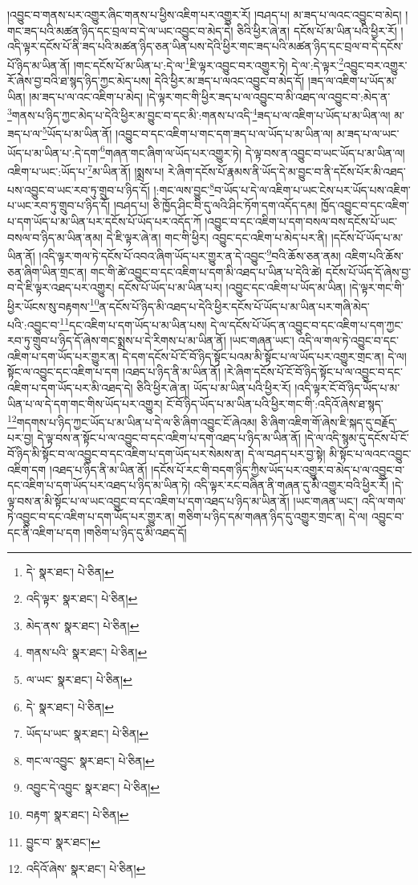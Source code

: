 །འབྱུང་བ་གནས་པར་འགྱུར་ཞིང་གནས་པ་ཕྱིས་འཇིག་པར་འགྱུར་རོ། །བཤད་པ། མ་ཟད་པ་ལའང་འབྱུང་བ་མེད། །གང་ཟད་པའི་མཚན་ཉིད་དང་བྲལ་བ་དེ་ལ་ཡང་འབྱུང་བ་མེད་དེ། ཅིའི་ཕྱིར་ཞེ་ན། དངོས་པོ་མ་ཡིན་པའི་ཕྱིར་རོ། །འདི་ལྟར་དངོས་པོ་ནི་ཟད་པའི་མཚན་ཉིད་ཅན་ཡིན་པས་དེའི་ཕྱིར་གང་ཟད་པའི་མཚན་ཉིད་དང་བྲལ་བ་དེ་དངོས་པོ་ཉིད་མ་ཡིན་ནོ། །གང་དངོས་པོ་མ་ཡིན་པ་:དེ་ལ་\footnote{དེ་  སྣར་ཐང་།  པེ་ཅིན། }ཇི་ལྟར་འབྱུང་བར་འགྱུར་ཏེ། དེ་ལ་:དེ་ལྟར་\footnote{འདི་ལྟར་  སྣར་ཐང་།  པེ་ཅིན། }འབྱུང་བར་འགྱུར་རོ་ཞེས་བྱ་བའི་ཐ་སྙད་ཉིད་ཀྱང་མེད་པས། དེའི་ཕྱིར་མ་ཟད་པ་ལའང་འབྱུང་བ་མེད་དོ། །ཟད་ལ་འཇིག་པ་ཡོད་མ་ཡིན། །མ་ཟད་པ་ལ་འང་འཇིག་པ་མེད། །དེ་ལྟར་གང་གི་ཕྱིར་ཟད་པ་ལ་འབྱུང་བ་མི་འཐད་ལ་འབྱུང་བ་:མེད་ན་\footnote{མེད་ནས་  སྣར་ཐང་།  པེ་ཅིན། }གནས་པ་ཉིད་ཀྱང་མེད་པ་དེའི་ཕྱིར་མ་བྱུང་བ་དང་མི་:གནས་པ་འདི་\footnote{གནས་པའི་  སྣར་ཐང་།  པེ་ཅིན། }ཟད་པ་ལ་འཇིག་པ་ཡོད་པ་མ་ཡིན་ལ། མ་ཟད་པ་ལ་\footnote{ལ་ཡང་  སྣར་ཐང་།  པེ་ཅིན། }ཡོད་པ་མ་ཡིན་ནོ། །འབྱུང་བ་དང་འཇིག་པ་གང་དག་ཟད་པ་ལ་ཡོད་པ་མ་ཡིན་ལ། མ་ཟད་པ་ལ་ཡང་ཡོད་པ་མ་ཡིན་པ་:དེ་དག་\footnote{དེ་  སྣར་ཐང་།  པེ་ཅིན། }གཞན་གང་ཞིག་ལ་ཡོད་པར་འགྱུར་ཏེ། དེ་ལྟ་བས་ན་འབྱུང་བ་ཡང་ཡོད་པ་མ་ཡིན་ལ། འཇིག་པ་ཡང་:ཡོད་པ་\footnote{ཡོད་པ་ཡང་  སྣར་ཐང་།  པེ་ཅིན། }མ་ཡིན་ནོ། །སྨྲས་པ། རེ་ཞིག་དངོས་པོ་རྣམས་ནི་ཡོད་དེ་མ་བྱུང་བ་ནི་དངོས་པོར་མི་འཐད་པས་འབྱུང་བ་ཡང་རབ་ཏུ་གྲུབ་པ་ཉིད་དོ། །:གང་ལས་བྱུང་\footnote{གང་ལ་འབྱུང་  སྣར་ཐང་།  པེ་ཅིན། }བ་ཡོད་པ་དེ་ལ་འཇིག་པ་ཡང་ངེས་པར་ཡོད་པས་འཇིག་པ་ཡང་རབ་ཏུ་གྲུབ་པ་ཉིད་དོ། །བཤད་པ། ཅི་ཁྱོད་ཤིང་བི་དུ་ལའི་ཤིང་ཏོག་དག་འདོད་དམ། ཁྱོད་འབྱུང་བ་དང་འཇིག་པ་དག་ཡོད་པ་མ་ཡིན་པར་དངོས་པོ་ཡོད་པར་འདོད་ཀོ །འབྱུང་བ་དང་འཇིག་པ་དག་བསལ་བས་དངོས་པོ་ཡང་བསལ་བ་ཉིད་མ་ཡིན་ནམ། དེ་ཇི་ལྟར་ཞེ་ན། གང་གི་ཕྱིར། འབྱུང་དང་འཇིག་པ་མེད་པར་ནི། །དངོས་པོ་ཡོད་པ་མ་ཡིན་ནོ། །འདི་ལྟར་གལ་ཏེ་དངོས་པོ་འབའ་ཞིག་ཡོད་པར་གྱུར་ན་དེ་འབྱུང་\footnote{འབྱུང་དེ་འབྱུང་  སྣར་ཐང་།  པེ་ཅིན། }བའི་ཆོས་ཅན་ནམ། འཇིག་པའི་ཆོས་ཅན་ཞིག་ཡིན་གྲང་ན། གང་གི་ཚེ་འབྱུང་བ་དང་འཇིག་པ་དག་མི་འཐད་པ་ཡིན་པ་དེའི་ཚེ། དངོས་པོ་ཡོད་དོ་ཞེས་བྱ་བ་དེ་ཇི་ལྟར་འཐད་པར་འགྱུར། དངོས་པོ་ཡོད་པ་མ་ཡིན་པར། །འབྱུང་དང་འཇིག་པ་ཡོད་མ་ཡིན། །དེ་ལྟར་གང་གི་ཕྱིར་ཡོངས་སུ་བརྟགས་\footnote{བརྟག་  སྣར་ཐང་།  པེ་ཅིན། }ན་དངོས་པོ་ཉིད་མི་འཐད་པ་དེའི་ཕྱིར་དངོས་པོ་ཡོད་པ་མ་ཡིན་པར་གཞི་མེད་པའི་:འབྱུང་བ་\footnote{བྱུང་བ་  སྣར་ཐང་། }དང་འཇིག་པ་དག་ཡོད་པ་མ་ཡིན་པས། དེ་ལ་དངོས་པོ་ཡོད་ན་འབྱུང་བ་དང་འཇིག་པ་དག་ཀྱང་རབ་ཏུ་གྲུབ་པ་ཉིད་དོ་ཞེས་གང་སྨྲས་པ་དེ་རིགས་པ་མ་ཡིན་ནོ། །ཡང་གཞན་ཡང་། འདི་ལ་གལ་ཏེ་འབྱུང་བ་དང་འཇིག་པ་དག་ཡོད་པར་གྱུར་ན། དེ་དག་དངོས་པོ་ངོ་བོ་ཉིད་སྟོང་པའམ་མི་སྟོང་པ་ལ་ཡོད་པར་འགྱུར་གྲང་ན། དེ་ལ། སྟོང་ལ་འབྱུང་དང་འཇིག་པ་དག །འཐད་པ་ཉིད་ནི་མ་ཡིན་ནོ། །རེ་ཞིག་དངོས་པོ་ངོ་བོ་ཉིད་སྟོང་པ་ལ་འབྱུང་བ་དང་འཇིག་པ་དག་ཡོད་པར་མི་འཐད་དེ། ཅིའི་ཕྱིར་ཞེ་ན། ཡོད་པ་མ་ཡིན་པའི་ཕྱིར་རོ། །འདི་ལྟར་ངོ་བོ་ཉིད་ཡོད་པ་མ་ཡིན་པ་ལ་དེ་དག་གང་གིས་ཡོད་པར་འགྱུར། ངོ་བོ་ཉིད་ཡོད་པ་མ་ཡིན་པའི་ཕྱིར་གང་གི་:འདིའོ་ཞེས་ཐ་སྙད་\footnote{འདིའོ་ཞེས་  སྣར་ཐང་།  པེ་ཅིན། }གདགས་པ་ཉིད་ཀྱང་ཡོད་པ་མ་ཡིན་པ་དེ་ལ་ཅི་ཞིག་འབྱུང་ངོ་ཞེའམ། ཅི་ཞིག་འཇིག་གོ་ཞེས་ཇི་སྐད་དུ་བརྗོད་པར་བྱ། དེ་ལྟ་བས་ན་སྟོང་པ་ལ་འབྱུང་བ་དང་འཇིག་པ་དག་འཐད་པ་ཉིད་མ་ཡིན་ནོ། །དེ་ལ་འདི་སྙམ་དུ་དངོས་པོ་ངོ་བོ་ཉིད་མི་སྟོང་བ་ལ་འབྱུང་བ་དང་འཇིག་པ་དག་ཡོད་པར་སེམས་ན། དེ་ལ་བཤད་པར་བྱ་སྟེ། མི་སྟོང་པ་ལའང་འབྱུང་འཇིག་དག །འཐད་པ་ཉིད་ནི་མ་ཡིན་ནོ། །དངོས་པོ་རང་གི་བདག་ཉིད་ཀྱིས་ཡོད་པར་འགྱུར་བ་མེད་པ་ལ་འབྱུང་བ་དང་འཇིག་པ་དག་ཡོད་པར་འཐད་པ་ཉིད་མ་ཡིན་ཏེ། འདི་ལྟར་རང་བཞིན་ནི་གཞན་དུ་མི་འགྱུར་བའི་ཕྱིར་རོ། །དེ་ལྟ་བས་ན་མི་སྟོང་པ་ལ་ཡང་འབྱུང་བ་དང་འཇིག་པ་དག་འཐད་པ་ཉིད་མ་ཡིན་ནོ། །ཡང་གཞན་ཡང་། འདི་ལ་གལ་ཏེ་འབྱུང་བ་དང་འཇིག་པ་དག་ཡོད་པར་གྱུར་ན། གཅིག་པ་ཉིད་དམ་གཞན་ཉིད་དུ་འགྱུར་གྲང་ན། དེ་ལ། འབྱུང་བ་དང་ནི་འཇིག་པ་དག །གཅིག་པ་ཉིད་དུ་མི་འཐད་དོ། 